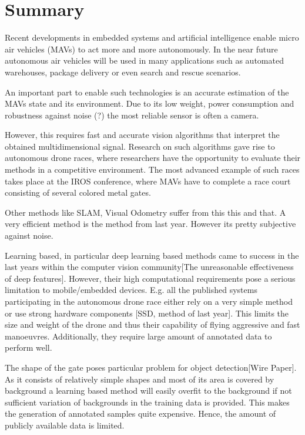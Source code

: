 \chapter*{Summary}

Recent developments in embedded systems and artificial intelligence enable micro air vehicles (MAVs) to act more and more autonomously. In the near future autonomous air vehicles will be used in many applications such as automated warehouses, package delivery or even search and rescue scenarios.

An important part to enable such technologies is an accurate estimation of the MAVs state and its environment. Due to its low weight, power consumption and robustness against noise (?) the most reliable sensor is often a camera. 

However, this requires fast and accurate vision algorithms that interpret the obtained multidimensional signal. Research on such algorithms gave rise to autonomous drone races, where researchers have the opportunity to evaluate their methods in a competitive environment. The most advanced example of such races takes place at the IROS conference, where MAVs have to complete a race court consisting of several colored metal gates.

Other methods like SLAM, Visual Odometry suffer from this this and that. A very efficient method is the method from last year. However its pretty subjective against noise.

Learning based, in particular deep learning based methods came to success in the last years within the computer vision community[The unreasonable effectiveness of deep features]. However, their high computational requirements pose a serious limitation to mobile/embedded devices. E.g. all the published systems participating in the autonomous drone race either rely on a very simple method or use strong hardware components [SSD, method of last year]. This limits the size and weight of the drone and thus their capability of flying aggressive and fast manoeuvres. Additionally, they require large amount of annotated data to perform well.

The shape of the gate poses particular problem for object detection[Wire Paper]. As it consists of relatively simple shapes and most of its area is covered by background a learning based method will easily overfit to the background if not sufficient variation of backgrounds in the training data is provided. This makes the generation of annotated samples quite expensive. Hence, the amount of publicly available data is limited. 

